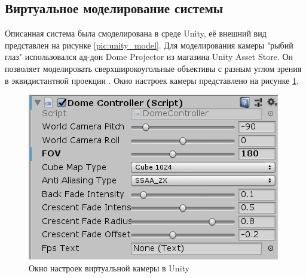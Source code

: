 \subsection{Виртуальное моделирование системы}

Описанная система была смоделирована в среде Unity, её внешний вид представлен на рисунке \ref{pic:unity_model}. Для 
моделирования камеры "рыбий глаз" использовался ад-дон Dome Projector из магазина Unity Asset Store.    %
Он позволяет моделировать сверхширокоугольные объективы с разным углом зрения в эквидистантной проекции \cite{}. %
Окно настроек камеры представлено на рисунке \ref{pic:camera_settings}.
\begin{figure}[H]
    \begin{center}
        \includegraphics[scale=0.5]{pics/camera_settings.png}                                                                                            %
        \caption{Окно настроек виртуальной камеры в Unity}
        \label{pic:camera_settings}
    \end{center}
\end{figure}